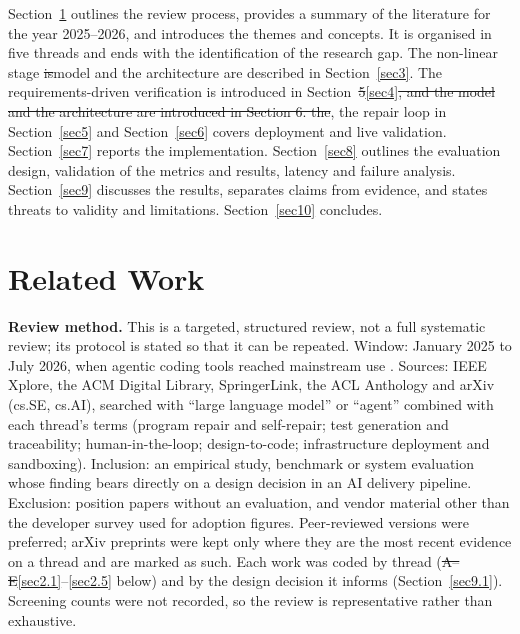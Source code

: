 \documentclass[pdflatex,sn-mathphys-num]{sn-jnl}%
\newcommand{\chg}[1]{{\color{blue}#1}}
\newcommand{\del}[1]{{\color{red}\sout{#1}}}
\newcommand{\fix}[1]{{\color{fixcol}#1}}
\newcommand{\fixdel}[1]{{\color{fixcol}\sout{#1}}}
\newcommand{\rw}[2]{{\color{rwcol}#1}}%
\theoremstyle{thmstyleone}%
\theoremstyle{thmstyletwo}%
\theoremstyle{thmstylethree}%
\begin{document}
\rw{Section~\ref{sec2} outlines the review process, provides a summary of the literature for the year 2025--2026, and introduces the themes and concepts. \fix{It is organised in} five threads and \fix{ends with the} identification of \fix{the} research gap. The non-linear stage \fixdel{is}\fix{model and the architecture are} described in Section~\ref{sec3}. The requirements-driven verification is introduced in Section~\fixdel{5}\fix{\ref{sec4}}\fixdel{, and the model and the architecture are introduced in Section 6. the}\fix{, the} repair loop \fix{in Section~\ref{sec5}} and Section~\ref{sec6} \fix{covers} deployment and live validation. Section~\ref{sec7} reports the implementation. Section~\ref{sec8} outlines the evaluation design, validation of the metrics and results, latency and failure analysis.}{Section~\ref{sec2} states the review method, summarises the 2025--2026 literature along five threads and identifies the research gap. Section~\ref{sec3} describes the non-linear stage model and the architecture, Section~\ref{sec4} the requirements-driven verification, Section~\ref{sec5} the repair loop and Section~\ref{sec6} deployment and live validation. Section~\ref{sec7} reports the implementation. Section~\ref{sec8} presents the evaluation design, metric validation, results, latency and failure analysis.} Section~\ref{sec9} discusses the results, separates claims from evidence, and states threats to validity and limitations. Section~\ref{sec10} concludes.

\section{Related Work}\label{sec2}

\textbf{Review method.} This is a targeted, structured review, not a full systematic review; its protocol is stated so that it can be repeated. Window: January 2025 to July 2026, when agentic coding tools reached mainstream use \cite{r03stackoverflow}. Sources: IEEE Xplore, the ACM Digital Library, SpringerLink, the ACL Anthology and arXiv (cs.SE, cs.AI), searched with ``large language model'' or ``agent'' combined with each thread's terms (program repair and self-repair; test generation and traceability; human-in-the-loop; design-to-code; infrastructure deployment and sandboxing). Inclusion: an empirical study, benchmark or system evaluation whose finding bears directly on a design decision in an AI delivery pipeline. Exclusion: position papers without an evaluation, and vendor material other than the developer survey used for adoption figures. Peer-reviewed versions were preferred; arXiv preprints were kept only where they are the most recent evidence on a thread and are marked as such. Each work was coded by thread (\del{A--E}\chg{\ref{sec2.1}--\ref{sec2.5}} below) and by the design decision it informs (Section~\ref{sec9.1}). Screening counts were not recorded, so the review is representative rather than exhaustive.%
\end{document}

